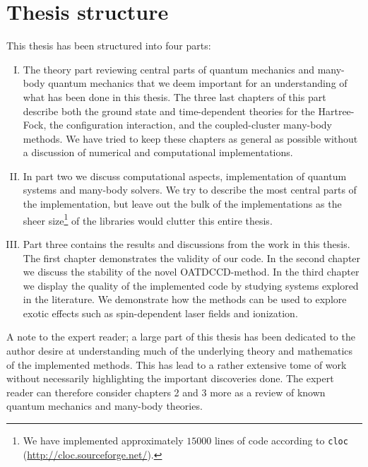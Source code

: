     \section{Thesis structure}
        This thesis has been structured into four parts:
        \begin{enumerate}[I.]
            \item The theory part reviewing central parts of quantum mechanics
                and many-body quantum mechanics that we deem important for an
                understanding of what has been done in this thesis.
                The three last chapters of this part describe both the ground
                state and time-dependent theories for the Hartree-Fock, the
                configuration interaction, and the coupled-cluster many-body
                methods.
                We have tried to keep these chapters as general as possible
                without a discussion of numerical and computational
                implementations.
            \item In part two we discuss computational aspects, implementation
                of quantum systems and many-body solvers.
                We try to describe the most central parts of the implementation,
                but leave out the bulk of the implementations as the sheer
                size\footnote{%
                    We have implemented approximately $15000$ lines of code
                    according to \texttt{cloc}
                    (\url{http://cloc.sourceforge.net/}).
                }
                of the libraries would clutter this entire thesis.
            \item Part three contains the results and discussions from the work
                in this thesis.
                The first chapter demonstrates the validity of our code.
                In the second chapter we discuss the stability of the novel
                OATDCCD-method.
                In the third chapter we display the quality of the implemented
                code by studying systems explored in the literature.
                We demonstrate how the methods can be used to explore exotic
                effects such as spin-dependent laser fields and ionization.
        \end{enumerate}
        A note to the expert reader; a large part of this thesis has been
        dedicated to the author desire at understanding much of the underlying
        theory and mathematics of the implemented methods.
        This has lead to a rather extensive tome of work without necessarily
        highlighting the important discoveries done.
        The expert reader can therefore consider chapters 2 and 3 more as a
        review of known quantum mechanics and many-body theories.

